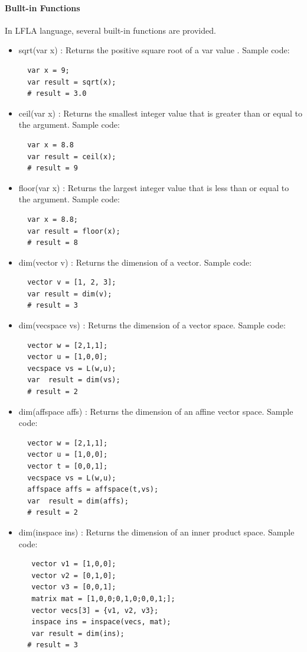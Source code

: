 \documentclass[12pt]{article} %
\begin{document}
\paragraph{Bullt-in Functions}
In LFLA language, several built-in functions are provided.
\begin{itemize}
\item sqrt(var x) :
 Returns the positive square root of a var value . Sample code:
\begin{lstlisting}
  var x = 9;
  var result = sqrt(x);
  # result = 3.0
\end{lstlisting}
\item ceil(var x)
: Returns the smallest integer value that is greater than or equal to the argument. Sample code:
\begin{lstlisting}
  var x = 8.8
  var result = ceil(x);
  # result = 9
\end{lstlisting}

\item floor(var x)
: Returns the largest integer value that is less than or equal to the argument. Sample code:
\begin{lstlisting}
  var x = 8.8;
  var result = floor(x);
  # result = 8
\end{lstlisting}

\item dim(vector v)
: Returns the dimension of a vector. Sample code:
\begin{lstlisting}
  vector v = [1, 2, 3];
  var result = dim(v);
  # result = 3
\end{lstlisting}

\item dim(vecspace vs)
: Returns the dimension of a vector space. Sample code:
\begin{lstlisting}
  vector w = [2,1,1];
  vector u = [1,0,0];
  vecspace vs = L(w,u);
  var  result = dim(vs);
  # result = 2
\end{lstlisting}

\item dim(affspace  affs)
: Returns the dimension of an affine vector space. Sample code:
\begin{lstlisting}
  vector w = [2,1,1];
  vector u = [1,0,0];
  vector t = [0,0,1];
  vecspace vs = L(w,u);
  affspace affs = affspace(t,vs);
  var  result = dim(affs);
  # result = 2
\end{lstlisting}

\item dim(inspace  ins)
: Returns the dimension of an inner product  space. Sample code:
\begin{lstlisting}
   vector v1 = [1,0,0];
   vector v2 = [0,1,0];
   vector v3 = [0,0,1]; 
   matrix mat = [1,0,0;0,1,0;0,0,1;];
   vector vecs[3] = {v1, v2, v3};
   inspace ins = inspace(vecs, mat); 
   var result = dim(ins);
  # result = 3
\end{lstlisting}


\end{itemize}
\end{document}
